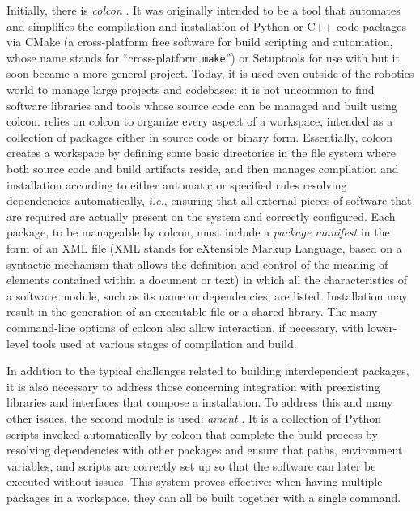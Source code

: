 Initially, there is \emph{colcon} \cite{thomas_colcon_nodate}. It was originally intended to be a tool that automates and simplifies the compilation and installation of Python or C++ code packages via CMake \cite{kitware_cmake_nodate} (a cross-platform free software for build scripting and automation, whose name stands for ``cross-platform \texttt{make}'') or Setuptools \cite{eby_setuptools_nodate} for use with \ROS but it soon became a more general project. Today, it is used even outside of the robotics world to manage large projects and codebases: it is not uncommon to find software libraries and tools whose source code can be managed and built using colcon. \ROS relies on colcon to organize every aspect of a workspace, intended as a collection of packages either in source code or binary form. Essentially, colcon creates a workspace by defining some basic directories in the file system where both source code and build artifacts reside, and then manages compilation and installation according to either automatic or specified rules resolving dependencies automatically, \emph{i.e.}, ensuring that all external pieces of software that are required are actually present on the system and correctly configured. Each package, to be manageable by colcon, must include a \emph{package manifest} in the form of an XML file (XML stands for eXtensible Markup Language, based on a syntactic mechanism that allows the definition and control of the meaning of elements contained within a document or text) in which all the characteristics of a software module, such as its name or dependencies, are listed. Installation may result in the generation of an executable file or a shared library. The many command-line options of colcon also allow interaction, if necessary, with lower-level tools used at various stages of compilation and build.

In addition to the typical challenges related to building interdependent packages, it is also necessary to address those concerning integration with preexisting libraries and interfaces that compose a \ROS installation. To address this and many other issues, the second module is used: \emph{ament} \cite{thomas_build_2015}. It is a collection of Python scripts invoked automatically by colcon that complete the build process by resolving dependencies with other \ROS packages and ensure that paths, environment variables, and scripts are correctly set up so that the software can later be executed without issues. This system proves effective: when having multiple packages in a workspace, they can all be built together with a single command.

